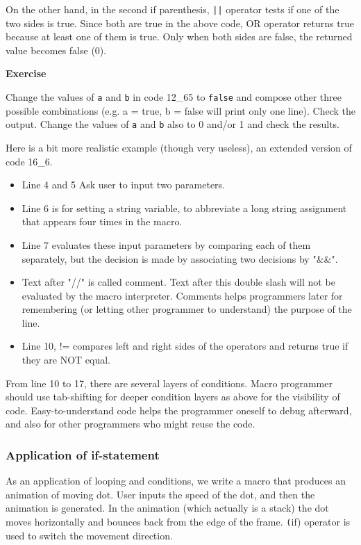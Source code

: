 \documentclass[11pt,a4paper,oneside]{report}
\newenvironment{indentexercise}[1]%
{{\setlength{\leftmargin}{2em}}%
\textbf{Exercise \thesubsection-#1}%
\begin{list}{}%
	\item%
}
{\end{list}}
\newcommand{\ilcom}[1]{\texttt{\small#1}}
\begin{document}
On the other hand, in the second if parenthesis,
\ilcom{||} operator tests if one of the two sides is true. Since both are
true in the above code, OR operator returns true because at least one of them is
true. Only when both sides are false, the returned value becomes false (0).

\begin{indentexercise}{1}
Change the values of \ilcom{a} and \ilcom{b} in code 12\_65 to \ilcom{false} and
compose other three possible combinations (e.g. a = true, b = false will print
only one line).
Check the output. Change the values of \ilcom{a} and \ilcom{b} also to 0 and/or
1 and check the results. 
\end{indentexercise}

Here is a bit more realistic example (though very useless), an extended version
of code 16\_6.

\begin{itemize}
\item Line 4 and 5 Ask user to input two parameters.
\item Line 6 is for setting a string variable, to abbreviate a long string assignment that appears four times in the macro.
\item Line 7 evaluates these input parameters by comparing each of them separately, but the decision is made by associating two decisions by "\&\&". 
\item Text after "//" is called comment. Text after this double slash will not be evaluated by the macro interpreter. Comments helps programmers later for remembering (or letting other programmer to understand) the purpose of the line. 
\item Line 10, != compares left and right sides of the operators and returns true if they are NOT equal.   
\end{itemize}
From line 10 to 17, there are several layers of conditions. Macro programmer should use tab-shifting for deeper condition layers as above for the visibility of code. Easy-to-understand code helps the programmer oneself to debug afterward, and also for other programmers who might reuse the code.
\subsubsection{Application of if-statement}
\label{sec:dotmove}

As an application of looping and conditions, we write a macro that produces an animation of moving dot. User inputs the speed of the dot, and then the animation is generated. 
In the animation (which actually is a stack) the dot moves horizontally and bounces back from the edge
of the frame. 
\ilcom(if) operator is used to switch the movement direction.

\end{document}
